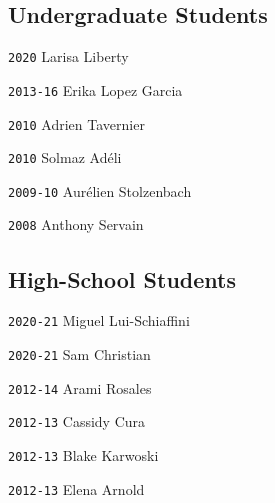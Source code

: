 \newpage
\begin{multicols}{2}

\vspace{-1em}
\subsection*{Undergraduate Students}

\noindent \texttt{2020} \tab Larisa Liberty

\noindent \texttt{2013-16} \tab Erika Lopez Garcia

\noindent \texttt{2010} \tab Adrien Tavernier

\noindent \texttt{2010} \tab Solmaz Adéli

\noindent \texttt{2009-10} \tab Aurélien Stolzenbach

\noindent \texttt{2008} \tab Anthony Servain

\columnbreak
\vspace{-1em}
\subsection*{High-School Students}

\noindent \texttt{2020-21} \tab Miguel Lui-Schiaffini

\noindent \texttt{2020-21} \tab Sam Christian

\noindent \texttt{2012-14} \tab Arami Rosales

\noindent \texttt{2012-13} \tab Cassidy Cura

\noindent \texttt{2012-13} \tab Blake Karwoski

\noindent \texttt{2012-13} \tab Elena Arnold

\end{multicols}